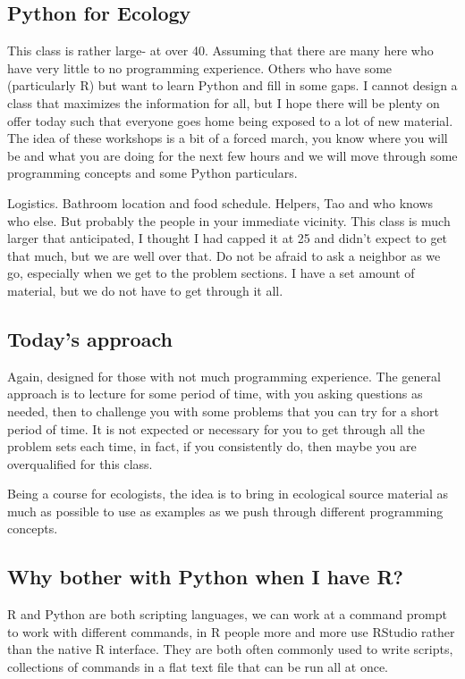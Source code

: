 \documentclass[12pt, A4]{article}
\begin{document}
\subsection{Python for Ecology}  
This class is rather large- at over 40.  Assuming that there are many here who have very little to no programming experience.  Others who have some (particularly R) but want to learn Python and fill in some gaps.  I cannot design a class that maximizes the information for all, but I hope there will be plenty on offer today such that everyone goes home being exposed to a lot of new material.  The idea of these workshops is a bit of a forced march, you know where you will be and what you are doing for the next few hours and we will move through some programming concepts and some Python particulars.

Logistics.  Bathroom location and food schedule.  Helpers, Tao and who knows who else.  But probably the people in your immediate vicinity.  This class is much larger that anticipated, I thought I had capped it at 25 and didn't expect to get that much, but we are well over that.  Do not be afraid to ask a neighbor as we go, especially when we get to the problem sections.  I have a set amount of material, but we do not have to get through it all.

\subsection{Today's approach} 
Again, designed for those with not much programming experience.  The general approach is to lecture for some period of time, with you asking questions as needed, then to challenge you with some problems that you can try for a short period of time.  It is not expected or necessary for you to get through all the problem sets each time, in fact, if you consistently do, then maybe you are overqualified for this class.

Being a course for ecologists, the idea is to bring in ecological source material as much as possible to use as examples as we push through different programming concepts.

\subsection{Why bother with Python when I have R?}  
R and Python are both scripting languages, we can work at a command prompt to work with different commands, in R people more and more use RStudio rather than the native R interface.  They are both often commonly used to write scripts, collections of commands in a flat text file that can be run all at once.
\end{document}

